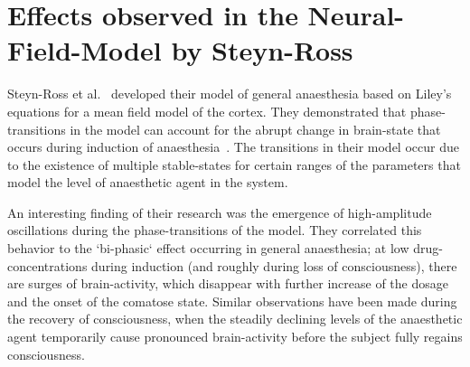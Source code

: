 \section{Effects observed in the Neural-Field-Model by Steyn-Ross}\label{sec:effects-observed-in-the-neural-field-model-by-steyn-ross}
Steyn-Ross et al.\ \cite{steyn_ross_modelling_2004, steyn_ross_sleep_2005, hutt_progress_2011} developed their
model of general anaesthesia based on Liley's\cite{liley_continuum_1999} equations for a mean field model of the cortex.
They demonstrated that phase-transitions in the model can account for the abrupt change
in brain-state that occurs during induction of anaesthesia~\cite{steyn_ross_modelling_2004}.
The transitions in their model occur due to the existence of multiple stable-states for certain ranges of the
parameters that model the level of anaesthetic agent in the system.

An interesting finding of their research was the emergence of high-amplitude oscillations during the phase-transitions
of the model.
They correlated this behavior to the `bi-phasic` effect occurring in general anaesthesia;
at low drug-concentrations during induction (and roughly during loss of consciousness),
there are surges of brain-activity,
which disappear with further increase of the dosage and the onset of the comatose state.
Similar observations have been made during the recovery of consciousness,
when the steadily declining levels of the anaesthetic agent temporarily cause pronounced brain-activity before the
subject fully regains consciousness.

